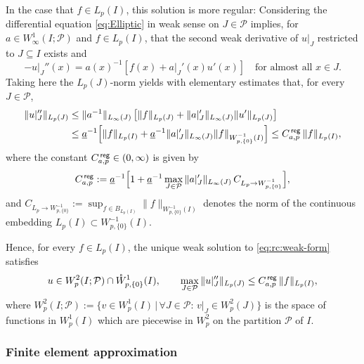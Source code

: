 \documentclass[reqno]{amsart}
\numberwithin{equation}{section}
\newcommand{\cP}{\mathcal{P}}
\newcommand{\norm}[2]{     \| #1       \|_{ #2 }}
\newcommand{\Wo}{\mathring{W}}
\theoremstyle{remark}
\theoremstyle{definition}
\begin{document}
In the case that $f\in L_p(I)$, 
this solution is more regular:
%
Considering the differential equation \eqref{eq:Elliptic} 
in weak sense on $J\in\cP$ implies, 
for $a\in W^1_\infty(I;\cP)$ and $f\in L_p(I)$, 
that  the second weak 
derivative of $u|_J$ 
restricted to $J\subseteq I$ 
exists and 
%
\[ 
-u|_J''(x) 
= 
a(x)^{-1} 
\left[ f(x) + a|_J'(x)u'(x) \right] 
\quad 
\text{for almost all } x\in J. 
\] 
%
Taking here the $L_p(J)$-norm yields 
with elementary estimates that, 
for every $J\in \cP$, 
%
\begin{align*}
\norm{ u|_J'' }{L_p(J)} 
&\leq  
\norm{ a^{-1} }{L_\infty(J)} 
\left[ 
\norm{ f }{L_p(J)} 
+ 
\norm{ a|_J' }{L_\infty(J)} 
\norm{ u' }{L_p(J)} 
\right]  
\\
&\leq 
\underline{a}^{-1} 
\Bigl[ 
\norm{ f }{L_p(I)} 
+ 
\underline{a}^{-1} 
\norm{ a|_J' }{L_\infty(J)} 
\norm{ f }{W^{-1}_{p,\{0\}}(I)} 
\Bigr]  
\leq 
C^{\sf\, reg}_{a,p} \,
\norm{ f }{L_p(I)} , 
\end{align*}
%
where the constant 
$C^{\sf\, reg}_{a,p}\in(0,\infty)$ 
is given by 
% 
\[
C^{\sf\, reg}_{a,p} 
:= 
\underline{a}^{-1} 
\Bigl[ 1 + 
\underline{a}^{-1}  
\max_{J\in\cP} \norm{ a|_J' }{L_\infty(J)} \,  
C_{L_p \to W^{-1}_{p,\{0\}}}  
\Bigr], 
\]
% 
and 
% 
$C_{L_p \to W^{-1}_{p,\{0\}}}
:= 
\sup\nolimits_{f \in B_{L_p(I)} } 
\norm{f}{W^{-1}_{p,\{0\}}(I)}$
% 
denotes the norm of the continuous 
embedding $L_p(I) \subset W^{-1}_{p,\{0\}}(I)$. 

Hence, for every $f\in L_p(I)$, 
the unique weak solution to \eqref{eq:rc:weak-form} 
satisfies 
%
\begin{equation}\label{eq:rc:SolReg} 
u\in W^2_p(I;\cP)\cap \Wo^1_{p,\{0\}}(I), 
\qquad 
\max_{J\in\cP} \norm{ u|_J'' }{L_p(J)}
\leq 
C^{\sf\, reg}_{a,p} 
\, \norm{f}{L_p(I)}, 
\end{equation}
%
where 
$W^2_p(I;\cP) 
:=
\bigl\{ v\in W^1_p(I) \,|\, \forall J\in \cP:  \, v|_J \in W^2_p(J) \bigr\} $
is the space of functions in $W^1_p(I)$ 
which are piecewise in $W^2_p$ 
on the partition $\cP$ of $I$.  


\subsubsection{Finite element approximation} 
\end{document}
